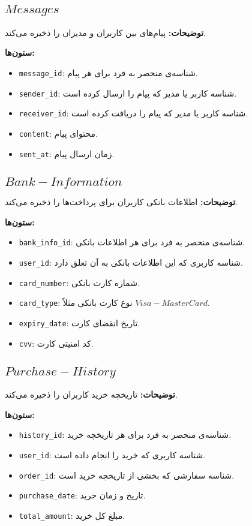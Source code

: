 \documentclass[12pt]{article}
\begin{document}
\subsection{\(Messages\)}

\textbf{توضیحات:} پیام‌های بین کاربران و مدیران را ذخیره می‌کند.

\textbf{ستون‌ها:}
\begin{itemize}
    \item \texttt{message\_id}: شناسه‌ی منحصر به فرد برای هر پیام.
    \item \texttt{sender\_id}: شناسه کاربر یا مدیر که پیام را ارسال کرده است.
    \item \texttt{receiver\_id}: شناسه کاربر یا مدیر که پیام را دریافت کرده است.
    \item \texttt{content}: محتوای پیام.
    \item \texttt{sent\_at}: زمان ارسال پیام.
\end{itemize}

\subsection{\(Bank-Information\)}

\textbf{توضیحات:} اطلاعات بانکی کاربران برای پرداخت‌ها را ذخیره می‌کند.

\textbf{ستون‌ها:}
\begin{itemize}
    \item \texttt{bank\_info\_id}: شناسه‌ی منحصر به فرد برای هر اطلاعات بانکی.
    \item \texttt{user\_id}: شناسه کاربری که این اطلاعات بانکی به آن تعلق دارد.
    \item \texttt{card\_number}: شماره کارت بانکی.
    \item \texttt{card\_type}: نوع کارت بانکی مثلاً \(Visa-MasterCard\).
    \item \texttt{expiry\_date}: تاریخ انقضای کارت.
    \item \texttt{cvv}: کد امنیتی کارت.
\end{itemize}

\subsection{\(Purchase-History\)}

\textbf{توضیحات:} تاریخچه خرید کاربران را ذخیره می‌کند.

\textbf{ستون‌ها:}
\begin{itemize}
    \item \texttt{history\_id}: شناسه‌ی منحصر به فرد برای هر تاریخچه خرید.
    \item \texttt{user\_id}: شناسه کاربری که خرید را انجام داده است.
    \item \texttt{order\_id}: شناسه سفارشی که بخشی از تاریخچه خرید است.
    \item \texttt{purchase\_date}: تاریخ و زمان خرید.
    \item \texttt{total\_amount}: مبلغ کل خرید.
\end{itemize}
\end{document}
